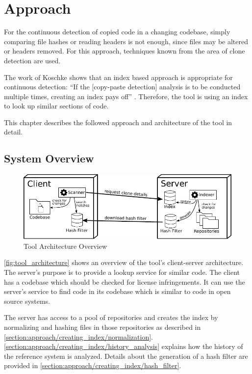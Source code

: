 
\chapter{Approach}\label{chapter:approach}
For the continuous detection of copied code in a changing codebase, simply comparing file hashes or reading headers is not enough, since files may be altered or headers removed.
For this approach, techniques known from the area of clone detection are used.

The work of Koschke shows that an index based approach is appropriate for continuous detection:
\enquote{If the [copy-paste detection] analysis is to be conducted multiple times, creating an index pays off} \cite{koschke2014large}.
Therefore, the tool is using an index to look up similar sections of code.

This chapter describes the followed approach and architecture of the tool in detail.

\section{System Overview}
\begin{figure}[h]
	\centering
	\includegraphics[width=\linewidth]{figures/architecture_overview.pdf}
	\caption{Tool Architecture Overview}\label{fig:tool_architecture}
\end{figure}
\autoref{fig:tool_architecture} shows an overview of the tool's client-server architecture.
The server's purpose is to provide a lookup service for similar code.
The client has a codebase which should be checked for license infringements.
It can use the server's service to find code in its codebase which is similar to code in open source systems.

The server has access to a pool of repositories and creates the index by normalizing and hashing files in those repositories as described in \autoref{section:approach/creating_index/normalization}.
\autoref{section:approach/creating_index/history_analysis} explains how the history of the reference system is analyzed.
Details about the generation of a hash filter are provided in \autoref{section:approach/creating_index/hash_filter}.

